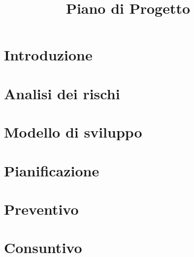 \documentclass{classes/base}
\title{Piano di Progetto}
\author{\angela}
\begin{document}
	\maketitle
	\newpage
	
	\newpage
	\tableofcontents
	\newpage
	\listoftables
	\newpage
	\listoffigures
	\newpage

	\section{Introduzione}
	
	
    \newpage
	\section{Analisi dei rischi}
	
	\newpage

	\section{Modello di sviluppo}
	

	\newpage
	\section{Pianificazione}
	

	\newpage
	\section{Preventivo}
	

	\newpage
	\section{Consuntivo}
	
	
\end{document}
